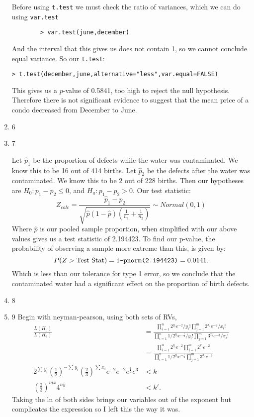 \documentclass{article}
\begin{document}
\begin{enumerate}
        Before using \verb|t.test| we must check the ratio of variances, which we can do using \verb|var.test|
        \begin{verbatim}
        > var.test(june,december)
        \end{verbatim}
        And the interval that this gives us does not contain 1, so we cannot conclude equal variance. So our \verb|t.test|:
        \begin{verbatim}
> t.test(december,june,alternative="less",var.equal=FALSE)
        \end{verbatim}
        This gives us a $p$-value of 0.5841, too high to reject the null hypothesis. Therefore there is not significant evidence to suggest
        that the mean price of a condo decreased from December to June.
    \item 6
    \item 7

        Let $\hat{p}_1$ be the proportion of defects while the water was contaminated. We know this to be 16 out of 414 births.
        Let $\hat{p}_2$ be the defects after the water was contaminated. We know this to be 2 out of 228 births. 
        Then our hypotheses are $H_0:p_1-p_2\leq 0$, and $H_a: p_1-p_2>0$. Our test statistic:
            $$Z_{calc}=\frac{\widehat{p}_1-\widehat{p}_2}{\sqrt{\widehat{p}(1-\widehat{p})\left(\frac1{n_1}+\frac1{n_2}\right)}}\sim Normal{\left(0,1\right)}$$
            Where $\hat{p}$ is our pooled sample proportion,
            when simplified with our above values gives us a test statistic of 2.194423. To find our p-value, the probability of observing
            a sample more extreme than this, is given by:
            \[
            P(Z>\text{Test Stat})=\verb|1-pnorm(2.194423)|=0.0141
            .\] 
            Which is less than our tolerance for type 1 error, so we conclude that the contaminated water had a significant effect on the proportion of 
            birth defects.
    
    \item 8
    \item 9
        Begin with neyman-pearson, using both sets of RVs,
        \begin{align*}
            \frac{L(H_0)}{L\left( H_a \right) }&=\frac{\prod_{i=1}^{n} 2^{y_i}e^{-{2}}/y_i! \prod_{j=1}^{m} 2^{x_i}e^{-2}/x_i!}
            {\prod_{i=1}^{n} 1 /2^{y_i}e^{-\frac{1}{2}}/y_i! \prod_{j=1}^{m} 3^{x_i}e^{-3}/x_i!} \\
            &=\frac{\prod_{i=1}^{n} 2^{y_i}e^{-{2}} \prod_{j=1}^{m} 2^{x_i}e^{-2}}
            {\prod_{i=1}^{n} 1 /2^{y_i}e^{-\frac{1}{2}} \prod_{j=1}^{m} 3^{x_i}e^{-3}} \\
            2^{\sum_{}^{} y_{i}}\left( \frac{1}{2} \right) ^{-\sum_{}^{} y_{i}}\left( \frac{2}{3} \right) ^{\sum_{}^{} x_{i}}e^{-2}e^{-2}e^{\frac{1}{2}}e^{3}&<k\\
            \left( \frac{2}{3} \right) ^{m\bar{x}}4^{n\bar{y}}&<k'
        .\end{align*}
        Taking the ln of both sides brings our variables out of the exponent but complicates the expression
        so I left this the way it was. 


\end{enumerate}
\end{document}
